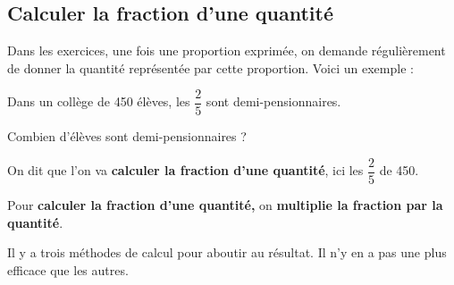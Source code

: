 \documentclass[a4paper]{book}
\begin{document}
\subsection{Calculer la fraction d'une quantité}
    Dans les exercices, une fois une proportion exprimée, on demande régulièrement de donner la quantité représentée par cette proportion. Voici un exemple :

    Dans un collège de 450 élèves, les $\dfrac{2}{5}$ sont demi-pensionnaires. 

    Combien d'élèves sont demi-pensionnaires ? 

    On dit que l'on va \textbf{calculer la fraction d'une quantité}, ici les $\dfrac{2}{5}$ de 450.
        

    \begin{propriete}
        Pour \textbf{calculer la fraction d'une quantité,} on \textbf{multiplie la fraction par la quantité}.

        Il y a trois méthodes de calcul pour aboutir au résultat. Il n'y en a pas une plus efficace que les autres.
    \end{propriete}
\end{document}
